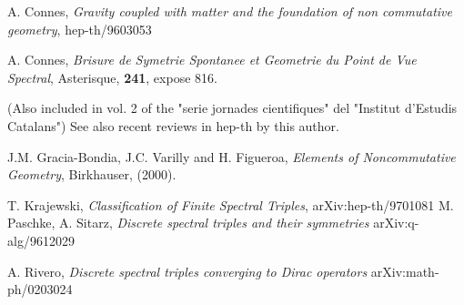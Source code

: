 \documentclass[a4paper,10pt]{article}
\begin{document}
\begin{thebibliography}{20}


A. Connes, {\it Gravity coupled with matter and the foundation of
non commutative geometry}, hep-th/9603053

A. Connes, {\it Brisure de Symetrie Spontanee et Geometrie du Point de Vue
Spectral}, Asterisque, {\bf 241}, expose 816.

(Also included in vol. 2 of the "serie jornades cientifiques" del "Institut 
d'Estudis Catalans")
See also recent reviews in hep-th by this author.

J.M. Gracia-Bondia, J.C. Varilly and H. Figueroa, {\it Elements of
Noncommutative Geometry}, Birkhauser, (2000).

T. Krajewski, {\it Classification of Finite Spectral Triples},
arXiv:hep-th/9701081
M. Paschke, A. Sitarz, {\it Discrete spectral triples and their 
symmetries} arXiv:q-alg/9612029

A. Rivero, {\it Discrete spectral triples converging to Dirac operators}
 arXiv:math-ph/0203024



\end{thebibliography}
\end{document}
